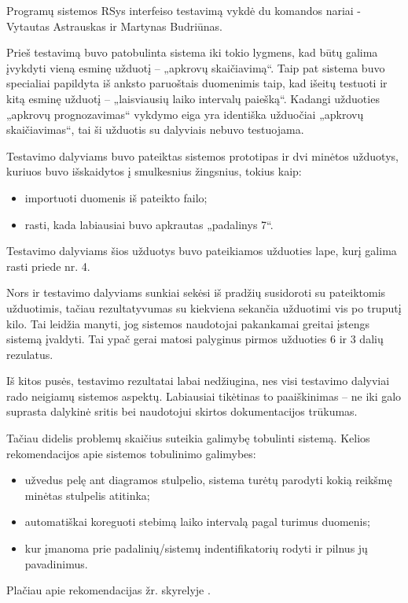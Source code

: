 Programų sistemos RSys interfeiso testavimą vykdė du komandos nariai -
Vytautas Astrauskas ir Martynas Budriūnas.

Prieš testavimą buvo patobulinta sistema iki tokio lygmens, kad būtų galima
įvykdyti vieną esminę užduotį – „apkrovų skaičiavimą“.
Taip pat sistema buvo specialiai papildyta iš anksto paruoštais
duomenimis taip, kad išeitų testuoti ir kitą esminę užduotį –
„laisviausių laiko intervalų paiešką“. Kadangi užduoties
„apkrovų prognozavimas“ vykdymo eiga yra identiška užduočiai
„apkrovų skaičiavimas“, tai ši užduotis su dalyviais nebuvo
testuojama.

Testavimo dalyviams buvo pateiktas sistemos prototipas ir dvi minėtos
užduotys, kuriuos buvo išskaidytos į smulkesnius žingsnius, tokius
kaip:
\begin{itemize}
  \item importuoti duomenis iš pateikto failo;
  \item rasti, kada labiausiai buvo apkrautas „padalinys 7“.
\end{itemize}

Testavimo dalyviams šios užduotys buvo pateikiamos užduoties lape,
kurį galima rasti priede nr. 4.

Nors ir testavimo dalyviams sunkiai sekėsi iš pradžių susidoroti su
pateiktomis užduotimis, tačiau rezultatyvumas su kiekviena sekančia
užduotimi vis po truputį kilo. Tai leidžia manyti, jog sistemos
naudotojai pakankamai greitai įstengs sistemą įvaldyti. Tai ypač gerai
matosi palyginus pirmos užduoties 6 ir 3 dalių rezulatus.

Iš kitos pusės, testavimo rezultatai labai nedžiugina, nes visi
testavimo dalyviai rado neigiamų sistemos aspektų. Labiausiai
tikėtinas to paaiškinimas – ne iki galo suprasta dalykinė sritis
bei naudotojui skirtos dokumentacijos trūkumas.

Tačiau didelis problemų skaičius suteikia galimybę tobulinti sistemą. Kelios
rekomendacijos apie sistemos tobulinimo galimybes:
\begin{itemize}
  \item užvedus pelę ant diagramos stulpelio, sistema turėtų parodyti kokią
  	reikšmę minėtas stulpelis atitinka;
  \item automatiškai koreguoti stebimą laiko intervalą pagal turimus
    duomenis;
  \item kur įmanoma prie padalinių/sistemų indentifikatorių rodyti
    ir pilnus jų pavadinimus.
\end{itemize}

Plačiau apie rekomendacijas žr. skyrelyje
.
